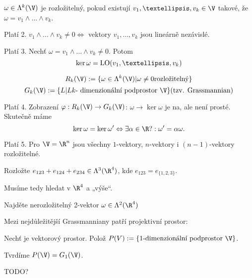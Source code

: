 \documentclass[12pt]{article}					%
\begin{document}
        \begin{definice}
            $\omega \in \Lambda^k(\V)$ je rozložitelný, pokud existují $v_1,…,v_k\in\V$ takové, že $\omega = v_1\land …\land v_k$.
        \end{definice}

        Platí 2. $v_1 \land … \land v_k \neq 0 \Leftrightarrow$ vektory $v_1,…,v_k$ jsou lineárně nezávislé.

        Platí 3. Nechť $\omega = v_1\land … \land v_k \neq 0$. Potom
        $$ \ker\omega = \LO(v_1,…,v_k) $$ 

        \begin{definice}
            $$ R_k(\V) := \{\omega \in \Lambda^k(\V)| \omega \neq 0 \text{rozložitelný}\}$$
            $$G_k(\V) := \{L|L k\text{- dimenzionální podprostor \V}\} (\text{tzv. Grassmannian})$$
        \end{definice}

        Platí 4. Zobrazení $\phi: R_k(\V) \rightarrow G_k(\V)$: $\omega \rightarrow \ker\omega$ je na, ale není prosté. Skutečně máme
        $$ \ker\omega = \ker\omega' \Leftrightarrow \exists\alpha\in\R\\?: \omega' = \alpha\omega. $$

        \begin{priklady}
            Platí 5. Pro $\V = \R^n$ jsou všechny $1$-vektory, $n$-vektory i $(n-1)$-vektory rozložitelné.
            \begin{prikladin}
                Rozložte $e_{123} + e_{124} + e_{234} \in \Lambda^3(\R^4)$, kde $e_{123} = e_{\{ 1, 2, 3 \}}$.
            \end{prikladin}

            Musíme tedy hledat v $\R^4$ a „výše“.
            \begin{prikladin}
                Najděte nerozložitelný 2-vektor $\omega \in \Lambda^2(\R^4)$
            \end{prikladin}
        \end{priklady}

        \begin{poznamka}
            Mezi nejdůležitější Grassmanniany patří projektivní prostor:

            Nechť \V je vektorový prostor. Polož $P(V) := \{1\text{-dimenzionální podprostor \V}\}$.

            Tvrdíme $P(\V) = G_1(\V)$.

            TODO?

        \end{poznamka}
\end{document}
